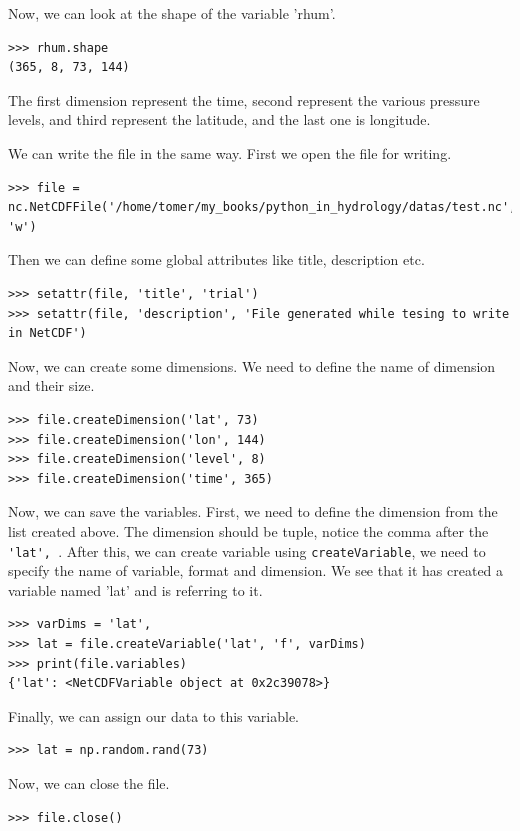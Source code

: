 \documentclass[10pt]{book}
\begin{document}
{Now, we can look at the shape of the variable 'rhum'.
\beforeverb \begin{verbatim}
>>> rhum.shape
(365, 8, 73, 144)
\end{verbatim} \afterverb
The first dimension represent the time, second represent the various pressure levels, and third represent the latitude, and the last one is longitude. 

We can write the file in the same way. First we open the file for writing. 
\beforeverb \begin{verbatim}
>>> file = nc.NetCDFFile('/home/tomer/my_books/python_in_hydrology/datas/test.nc', 'w')
\end{verbatim} \afterverb

Then we can define some global attributes like title, description etc.
\beforeverb \begin{verbatim}
>>> setattr(file, 'title', 'trial')
>>> setattr(file, 'description', 'File generated while tesing to write in NetCDF')
\end{verbatim} \afterverb

Now, we can create some dimensions. We need to define the name of dimension and their size. 
\beforeverb \begin{verbatim}
>>> file.createDimension('lat', 73) 
>>> file.createDimension('lon', 144) 
>>> file.createDimension('level', 8) 
>>> file.createDimension('time', 365) 
\end{verbatim} \afterverb

Now, we can save the variables. First, we need to define the dimension from the list created above. The dimension should be tuple, notice the comma after the \verb" 'lat', ". After this, we can create variable using \verb"createVariable", we need to specify the name of variable, format and dimension. We see that it has created a variable named 'lat' and is referring to it.
\beforeverb \begin{verbatim}
>>> varDims = 'lat',
>>> lat = file.createVariable('lat', 'f', varDims)
>>> print(file.variables)
{'lat': <NetCDFVariable object at 0x2c39078>}
\end{verbatim} \afterverb

Finally, we can assign our data to this variable. 
\beforeverb \begin{verbatim}
>>> lat = np.random.rand(73)
\end{verbatim} \afterverb
Now, we can close the file.
\beforeverb \begin{verbatim}
>>> file.close()
\end{verbatim} \afterverb

}
\end{document}
